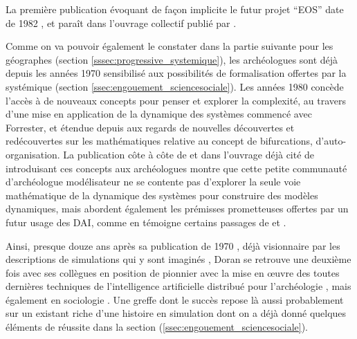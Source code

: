 
La première publication évoquant de façon implicite le futur projet \foreignquote{english}{EOS} date de 1982 \autocite{Doran1982}, et paraît dans l'ouvrage collectif publié par \textcite{Renfrew1982}.

Comme on va pouvoir également le constater dans la partie suivante pour les géographes (section \ref{sssec:progressive_systemique}), les archéologues sont déjà depuis les années 1970 sensibilisé aux possibilités de formalisation offertes par la systémique (section \ref{ssec:engouement_sciencesociale}). Les années 1980 concède l'accès à de nouveaux concepts pour penser et explorer la complexité, au travers d'une mise en application de la dynamique des systèmes commencé avec Forrester, et étendue depuis aux regards de nouvelles découvertes et redécouvertes sur les mathématiques relative au concept de bifurcations, d'auto-organisation. La publication côte à côte de \textcite{Doran1982} et \textcite{Allen1982} dans l'ouvrage déjà cité de \textcite{Renfrew1982} introduisant ces concepts aux archéologues montre que cette petite communauté d'archéologue modélisateur ne se contente pas d'explorer la seule voie mathématique de la dynamique des systèmes pour construire des modèles dynamiques, mais abordent également les prémisses prometteuses  offertes par un futur usage des DAI, comme en témoigne certains passages de \textcite{Doran1982}  et \textcite{Doran1986b} .

Ainsi, presque douze ans après sa publication de 1970 \autocite{Doran1970}, déjà visionnaire par les descriptions de simulations qui y sont imaginés , Doran se retrouve une deuxième fois avec ses collègues en position de pionnier avec la mise en œuvre des toutes dernières techniques de l'intelligence artificielle distribué pour l'archéologie , mais également en sociologie \autocite{Doran1985}. Une greffe dont le succès repose là aussi probablement sur un existant riche d'une histoire en simulation dont on a déjà donné quelques éléments de réussite dans la section (\ref{ssec:engouement_sciencesociale}).


